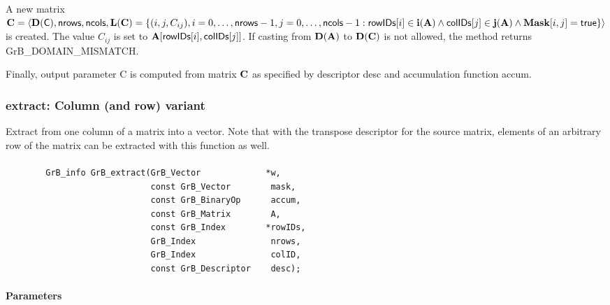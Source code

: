 A new matrix ${\bf C} = \langle \bold{D}({\sf C}),{\sf nrows},{\sf ncols},
\bold{L}({\bf C}) = \{ (i,j,C_{ij}), i = 0,\ldots,{\sf nrows}-1, j = 0, \ldots,{\sf ncols}-1 : {\sf rowIDs}[i]
\in \bold{i}({\bf A}) \wedge {\sf colIDs}[j] \in \bold{j}({\bf A}) \wedge {\bf Mask}[i,j] = {\sf true} \} \rangle$ is created. 
The value $C_{ij}$ is set to ${\bf A}[{\sf rowIDs}[i],{\sf colIDs}[j]]$. If
casting from $\bold{D}({\bf A})$ to $\bold{D}({\bf C})$ is not
allowed, the method returns {\sf GrB\_DOMAIN\_MISMATCH}.

Finally, output parameter {\sf C} is computed from matrix ${\bf C}$ as
specified by descriptor {\sf desc} and accumulation function {\sf accum}.

\subsubsection{{\sf extract}: Column (and row) variant}

Extract from one column of a matrix into a vector.  Note that with the transpose
descriptor for the source matrix, elements of an arbitrary row of the matrix
can be extracted with this function as well.

\paragraph{\syntax}

\begin{verbatim}
        GrB_info GrB_extract(GrB_Vector             *w,
                             const GrB_Vector        mask,
                             const GrB_BinaryOp      accum,
                             const GrB_Matrix        A,
                             const GrB_Index        *rowIDs,
                             GrB_Index               nrows,
                             GrB_Index               colID,
                             const GrB_Descriptor    desc); 
\end{verbatim}

\paragraph{Parameters}

